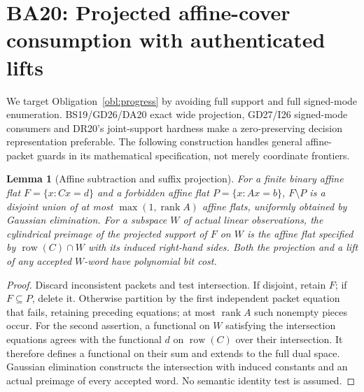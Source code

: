 \documentclass[11pt]{article}
\newtheorem{lemma}[theorem]{Lemma}
\begin{document}
\section{BA20: Projected affine-cover consumption with authenticated lifts}\label{sec:ba20}
We target Obligation~\ref{obl:progress} by avoiding full support and full signed-mode enumeration. BS19/GD26/DA20 exact wide projection, GD27/I26 signed-mode consumers and DR20's joint-support hardness make a zero-preserving decision representation preferable. The following construction handles general affine-packet guards in its mathematical specification, not merely coordinate frontiers.

\begin{lemma}[Affine subtraction and suffix projection]\label{lem:ba20-proj}
For a finite binary affine flat $F=\{x:Cx=d\}$ and a forbidden affine flat $P=\{x:Ax=b\}$, $F\setminus P$ is a disjoint union of at most $\max(1,\operatorname{rank} A)$ affine flats, uniformly obtained by Gaussian elimination. For a subspace $W$ of actual linear observations, the cylindrical preimage of the projected support of $F$ on $W$ is the affine flat specified by $\operatorname{row}(C)\cap W$ with its induced right-hand sides. Both the projection and a lift of any accepted $W$-word have polynomial bit cost.
\end{lemma}
\begin{proof}
Discard inconsistent packets and test intersection. If disjoint, retain $F$; if $F\subseteq P$, delete it. Otherwise partition by the first independent packet equation that fails, retaining preceding equations; at most $\operatorname{rank} A$ such nonempty pieces occur. For the second assertion, a functional on $W$ satisfying the intersection equations agrees with the functional $d$ on $\operatorname{row}(C)$ over their intersection. It therefore defines a functional on their sum and extends to the full dual space. Gaussian elimination constructs the intersection with induced constants and an actual preimage of every accepted word. No semantic identity test is assumed.
\end{proof}
\end{document}
